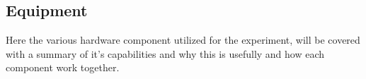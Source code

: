 \subsection{Equipment}
Here the various hardware component utilized for the experiment, will be covered with a summary of it's capabilities and why this is usefully and how each component work together.